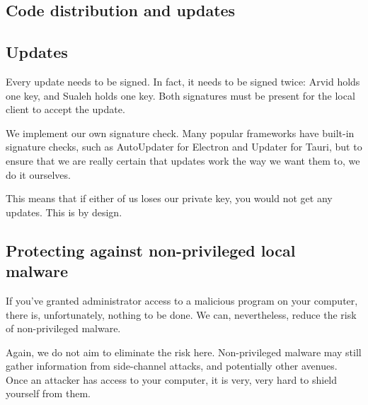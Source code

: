 \subsection{Code distribution and updates}










\subsection{Updates}

Every update needs to be signed. In fact, it needs to be signed twice: Arvid holds one key, and Sualeh holds one key. Both signatures must be present for the local client to accept the update.

We implement our own signature check. Many popular frameworks have built-in signature checks, such as AutoUpdater for Electron and Updater for Tauri, but to ensure that we are really certain that updates work the way we want them to, we do it ourselves.

This means that if either of us loses our private key, you would not get any updates. This is by design.

\subsection{Protecting against non-privileged local malware}

If you've granted administrator access to a malicious program on your computer, there is, unfortunately, nothing to be done. We can, nevertheless, reduce the risk of non-privileged malware.


Again, we do not aim to eliminate the risk here. Non-privileged malware may still gather information from side-channel attacks, and potentially other avenues. Once an attacker has access to your computer, it is very, very hard to shield yourself from them.